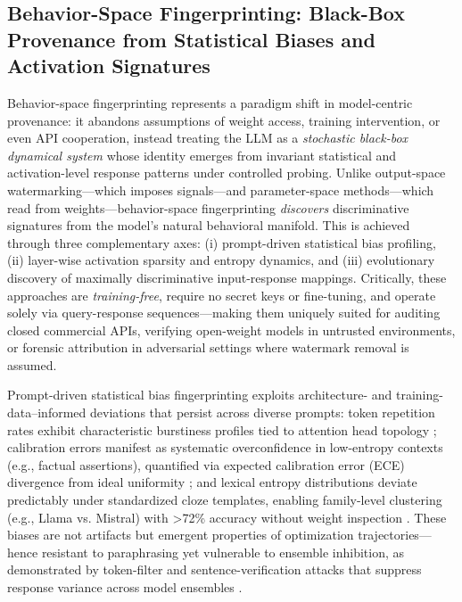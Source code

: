 \documentclass[11pt,a4paper]{article}
\begin{document}
\subsection{Behavior-Space Fingerprinting: Black-Box Provenance from Statistical Biases and Activation Signatures}


Behavior-space fingerprinting represents a paradigm shift in model-centric provenance: it abandons assumptions of weight access, training intervention, or even API cooperation, instead treating the LLM as a \emph{stochastic black-box dynamical system} whose identity emerges from invariant statistical and activation-level response patterns under controlled probing. Unlike output-space watermarking---which imposes signals---and parameter-space methods---which read from weights---behavior-space fingerprinting \emph{discovers} discriminative signatures from the model's natural behavioral manifold. This is achieved through three complementary axes: (i) prompt-driven statistical bias profiling, (ii) layer-wise activation sparsity and entropy dynamics, and (iii) evolutionary discovery of maximally discriminative input-response mappings. Critically, these approaches are \emph{training-free}, require no secret keys or fine-tuning, and operate solely via query-response sequences---making them uniquely suited for auditing closed commercial APIs, verifying open-weight models in untrusted environments, or forensic attribution in adversarial settings where watermark removal is assumed.

Prompt-driven statistical bias fingerprinting exploits architecture- and training-data--informed deviations that persist across diverse prompts: token repetition rates exhibit characteristic burstiness profiles tied to attention head topology \cite{arxiv:2305.08883}; calibration errors manifest as systematic overconfidence in low-entropy contexts (e.g., factual assertions), quantified via expected calibration error (ECE) divergence from ideal uniformity \cite{arxiv:2403.04808}; and lexical entropy distributions deviate predictably under standardized cloze templates, enabling family-level clustering (e.g., Llama vs. Mistral) with >72\% accuracy without weight inspection \cite{arxiv:2601.01296}. These biases are not artifacts but emergent properties of optimization trajectories---hence resistant to paraphrasing yet vulnerable to ensemble inhibition, as demonstrated by token-filter and sentence-verification attacks that suppress response variance across model ensembles \cite{arxiv:2601.04261}.
\end{document}
